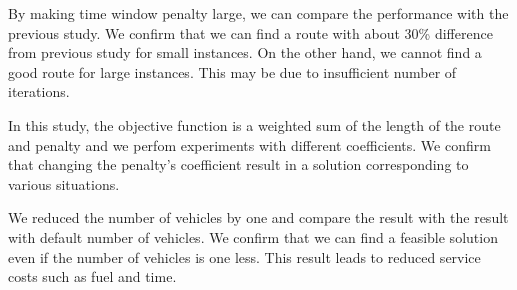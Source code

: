 By making time window penalty large, we can compare the performance with the previous study. We confirm that we can find a route with about 30\% difference from previous study for small instances. On the other hand, we cannot find a good route for large instances. This may be due to insufficient number of iterations.

In this study, the objective function is a weighted sum of the length of the route and penalty and we perfom experiments with different coefficients.
We confirm that changing the penalty's coefficient result in a solution corresponding to various situations.

We reduced the number of vehicles by one and compare the result with the result with default number of vehicles. We confirm that we can find a feasible solution even if the number of vehicles is one less.
This result leads to reduced service costs such as fuel and time.
